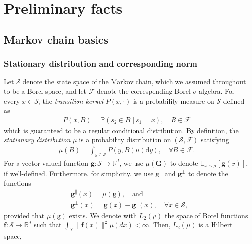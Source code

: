 \section{Preliminary facts}

\subsection{Markov chain basics}\label{app:MC-basics}

\subsubsection{Stationary distribution and corresponding norm}
Let $\mathcal{S}$ denote the state space of the Markov chain, which we assumed throughout to be a Borel space, and let $\mathscr{F}$ denote the corresponding Borel $\sigma$-algebra. For every $x \in \mathcal{S}$, the \emph{transition kernel} $P(x,\cdot)$ is a probability measure on $\mathcal{S}$ defined as
\begin{align*}
P(x,B) = \mathbb{P}(s_2 \in B \mid s_1 = x), \quad B \in \mathscr{F}
\end{align*}
which is guaranteed to be a regular conditional distribution.  
By definition, the  \emph{stationary distribution} $\mu$ is a probability distribution on $(\mathcal{S},\mathscr{F})$ satisfying
\begin{align*}
\mu(B) = \int_{y \in \mathcal{S}}P(y,B) \mu(\mathrm{d}y), \quad \forall B \in \mathcal{F}.
\end{align*}
 For a vector-valued function $\bm{g}: \mathcal{S} \to \mathbb{R}^{d}$, we use $\mu(\bm{G})$ to denote $\mathbb{E}_{x \sim \mu} [\bm{g}(x)]$, if well-defined. Furthermore, for simplicity, we use $\bm{g}^{\parallel}$ and $\bm{g}^{\perp}$ to denote the functions
\begin{align*}
&\bm{g}^{\parallel}(x) = \mu(\bm{g}), \quad \text{and} \\ 
&\bm{g}^{\perp}(x) = \bm{g}(x) - \bm{g}^{\parallel}(x), \quad \forall x \in \mathcal{S},
\end{align*}
provided that $\mu(\bm{g})$ exists.
We denote with $L_2(\mu)$ the space of Borel functions $\bm{f}\colon \mathcal{S} \to \mathbb{R}^{d}$ such that $\int_{\mathcal{S}} \| \bm{f}(x) \|^2 \mu(dx) < \infty $. Then, $L_2(\mu)$ is a Hilbert space, %

